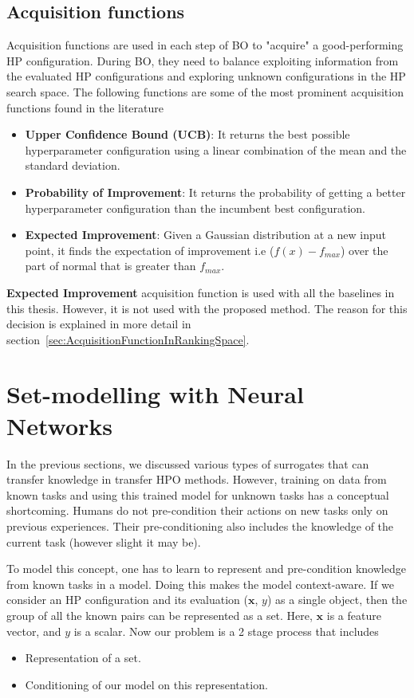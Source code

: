 \documentclass[12pt, twoside, ngerman]{report}
\begin{document}

 

\subsection{Acquisition functions}
Acquisition functions are used in each step of BO to "acquire" a good-performing HP configuration.
During BO, they need to balance exploiting information from the evaluated HP configurations and exploring unknown configurations in the HP search space.
The following functions are some of the most prominent acquisition functions found in the literature~\cite{GPTutorial}
\begin{itemize}
\item \textbf{Upper Confidence Bound (UCB)}: It returns the best possible hyperparameter configuration using a linear combination of the mean and the standard deviation.
\item \textbf{Probability of Improvement}: It returns the probability of getting a better hyperparameter configuration than the incumbent best configuration.
\item \textbf{Expected Improvement}: Given a Gaussian distribution at a new input point, it finds the expectation of improvement i.e ($f(x) - f_{max}$) over the part of normal that is greater than $f_{max}$.
\end{itemize}

 \textbf{Expected Improvement} acquisition function is used with all the baselines in this thesis. However, it is not used with the proposed method. The reason for this decision is explained in more detail in section~\ref{sec:AcquisitionFunctionInRankingSpace}.


\section{Set-modelling with Neural Networks}

In the previous sections, we discussed various types of surrogates that can transfer knowledge in transfer HPO methods.
However, training on data from known tasks and using this trained model for unknown tasks has a conceptual shortcoming.
Humans do not pre-condition their actions on new tasks only on previous experiences.
Their pre-conditioning also includes the knowledge of the current task (however slight it may be).

To model this concept, one has to learn to represent and pre-condition knowledge from known tasks in a model.
Doing this makes the model context-aware.
If we consider an HP configuration and its evaluation ($\textbf{x}$, $y$) as a single object, then the group of all the known pairs can be represented as a set.
Here, $\textbf{x}$ is a feature vector, and $y$ is a scalar.
Now our problem is a 2 stage process that includes
\begin{itemize}
\item Representation of a set.
\item Conditioning of our model on this representation.
\end{itemize}
\end{document}
